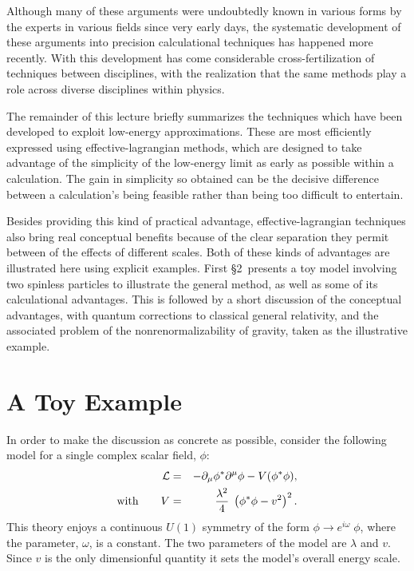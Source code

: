Although many of these arguments were undoubtedly known in various
forms by the experts in various fields since very early days, 
the systematic development of these arguments into precision
calculational techniques has happened more recently. With this
development has come considerable cross-fertilization of 
techniques between disciplines, with the realization that the same 
methods play a role across diverse disciplines within physics. 

The remainder of this lecture briefly summarizes the
techniques which have been developed to exploit low-energy
approximations. These are most efficiently expressed
using effective-lagrangian methods, which are designed
to take advantage of the simplicity of the low-energy limit
as early as possible within a calculation. The gain in
simplicity so obtained can be the decisive difference
between a calculation's being feasible rather than 
being too difficult to entertain. 

Besides providing this kind of practical advantage, 
effective-lagrangian techniques also bring real conceptual 
benefits because of the clear separation they permit between
of the effects of different scales. Both of these kinds of
advantages are illustrated here using explicit examples. First
\S2\ presents a toy model involving two spinless particles to
illustrate the general method, as well as some of its 
calculational advantages. This is followed by a short 
discussion of the conceptual advantages, with 
quantum corrections to classical general relativity, 
and the associated problem of the nonrenormalizability 
of gravity, taken as the illustrative example. 

\section{A Toy Example}

In order to make the discussion as concrete as possible,
consider the following model for a single complex scalar field, $\phi$:
%
\begin{eqnarray}
\label{abeltoymodel}
{\cal L} &=& - \partial_\mu \phi^* \partial^\mu \phi - 
V(\phi^* \phi), \nonumber\\
\hbox{with} \qquad V &=& {\lambda^2 \over 4} \; 
\left( \phi^* \phi - v^2 \right)^2 .
\end{eqnarray}
%
This theory enjoys a continuous $U(1)$ symmetry of the form 
$\phi \to e^{i\omega} \; \phi$, where the parameter, $\omega$, 
is a constant. The two parameters of the model are 
$\lambda$ and $v$. Since $v$ is the only dimensionful 
quantity it sets the model's overall energy scale.

